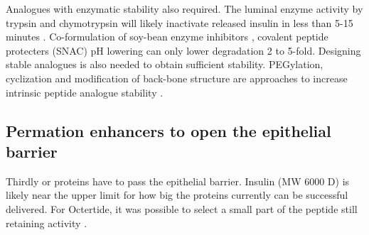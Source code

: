 Analogues with enzymatic stability \DIFdelbegin {}\DIFdelend \DIFaddbegin {}\DIFaddend also required. The luminal enzyme activity by trypsin and chymotrypsin will likely inactivate released insulin in less than 5-15 minutes \cite{welling2014citric}. Co-formulation of soy-bean enzyme inhibitors \cite{fujii1985promoting}, covalent peptide protecters (SNAC) \cite{bruno2013basics} \DIFdelbegin \DIFdel{, }\DIFdelend \DIFaddbegin {}\DIFaddend pH lowering \cite{welling2014citric} can only lower degradation 2 to 5-fold. Designing stable analogues is also needed to obtain sufficient stability. PEGylation, cyclization and modification of back-bone structure are \DIFdelbegin {}\DIFdelend \DIFaddbegin {}\DIFaddend approaches to increase intrinsic peptide analogue stability \cite{bruno2013basics}.

\subsection{Permation enhancers to open the epithelial barrier}
Thirdly \DIFdelbegin {}\DIFdelend \DIFaddbegin {}\DIFaddend or proteins have to pass the epithelial barrier. Insulin (MW 6000 D) is likely near the upper limit for how big the proteins currently can be successful delivered. For Octertide, it was possible to select a small part of the peptide \DIFdelbegin {}\DIFdelend \DIFaddbegin {}\DIFaddend still retaining activity \cite{aguiree2013idf}. 

